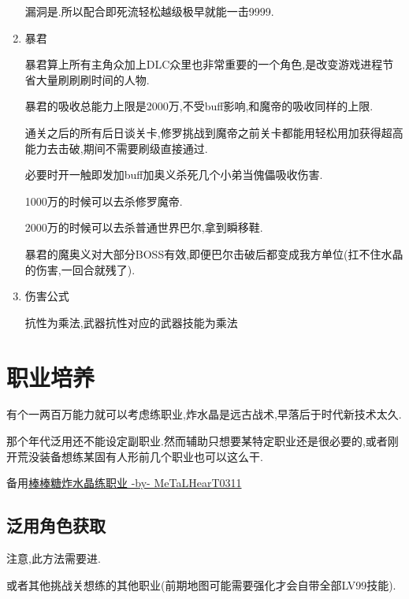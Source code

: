 \begin{enumerate}
	漏洞是{\color{red}{练武5吃即死}}.所以配合即死流轻松越级极早就能一击9999.

	\item{暴君}

	暴君算上所有主角众加上DLC众里也非常重要的一个角色,是改变游戏进程节省大量刷刷刷时间的人物.

	暴君的吸收总能力上限是2000万,不受buff影响,和魔帝的吸收同样的上限.

	通关之后的所有后日谈关卡,修罗挑战到魔帝之前关卡都能用轻松用{\color{red}{即死流}}加{\color{red}{暴君吸收}}获得超高能力去击破,期间不需要刷级直接通过.

	必要时开一触即发加buff加奥义杀死几个小弟当傀儡吸收伤害.

	1000万的时候可以去杀修罗魔帝.

	2000万的时候可以去杀普通世界巴尔,拿到瞬移鞋.

	暴君的魔奥义对大部分BOSS有效,即便巴尔击破后都变成我方单位(扛不住水晶的伤害,一回合就残了).

	\item{伤害公式}

	抗性为乘法,武器抗性对应的武器技能为乘法

\end{enumerate}

\newpage


	\section{职业培养}

	有个一两百万能力就可以考虑练职业,炸水晶是远古战术,早落后于时代新技术太久.

	那个年代泛用还不能设定副职业.然而辅助只想要某特定职业还是很必要的,或者刚开荒没装备想练某固有人形前几个职业也可以这么干.

	备用\href{http://tieba.baidu.com/p/3717431968}{棒棒糖炸水晶练职业 -by- MeTaLHearT0311}

		\subsection{泛用角色获取}

		注意,此方法需要进{\color{red}{修罗以后}}.

		{\color{red}{去兔兔魔城挑战关,抓捕贤者}}或者其他挑战关想练的其他职业(前期地图可能需要强化才会自带全部LV99技能).

